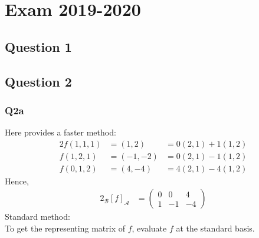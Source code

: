 \section{Exam 2019-2020}

\subsection{Question 1}
\subsection{Question 2}
\subsubsection{Q2a}
Here provides a faster method:
\begin{alignat*}{2}
	f(1, 1, 1) & = (1, 2)   & = 0 (2, 1) + 1 (1, 2) \\
	f(1, 2, 1) & = (-1, -2) & = 0 (2, 1) - 1 (1, 2) \\
	f(0, 1, 2) & = (4, -4)  & = 4 (2, 1) - 4 (1, 2)
\end{alignat*}
Hence,
\begin{alignat*}{2}
	{}_\mathcal{B}[f]_{\mathcal{A}} & =
	\begin{pmatrix}
		0 & 0  & 4  \\
		1 & -1 & -4
	\end{pmatrix}
\end{alignat*}
Standard method:\\
To get the representing matrix of $f$, evaluate $f$ at the standard basis.
